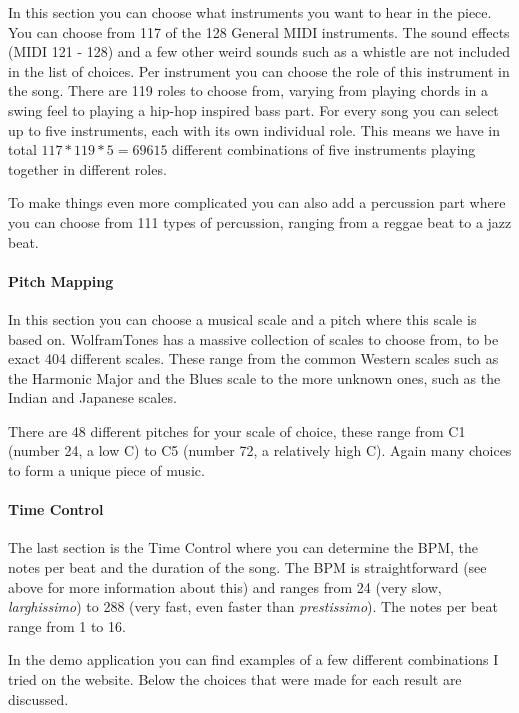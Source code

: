 \documentclass[12pt]{article}
\begin{document}
In this section you can choose what instruments you want to hear in the piece. You can choose from 117 of the 128 General MIDI instruments. The sound effects (MIDI 121 - 128) and a few other weird sounds such as a whistle are not included in the list of choices. Per instrument you can choose the role of this instrument in the song. There are 119 roles to choose from, varying from playing chords in a swing feel to playing a hip-hop inspired bass part. For every song you can select up to five instruments, each with its own individual role. This means we have in total $117*119*5 = 69615$ different combinations of five instruments playing together in different roles.

To make things even more complicated you can also add a percussion part where you can choose from 111 types of percussion, ranging from a reggae beat to a jazz beat.

\paragraph{Pitch Mapping}

 In this section you can choose a musical scale and a pitch where this scale is based on. WolframTones has a massive collection of scales to choose from, to be exact 404 different scales. These range from the common Western scales such as the Harmonic Major and the Blues scale to the more unknown ones, such as the Indian and Japanese scales.

There are 48 different pitches for your scale of choice, these range from C1 (number 24, a low C) to C5 (number 72, a relatively high C). Again many choices to form a unique piece of music.

\paragraph{Time Control}

The last section is the Time Control where you can determine the BPM, the notes per beat and the duration of the song. The BPM is straightforward (see above for more information about this) and ranges from 24 (very slow, \textit{larghissimo}) to 288 (very fast, even faster than \textit{prestissimo}).
The notes per beat range from 1 to 16.
\newline

In the demo application you can find examples of a few different combinations I tried on the website. Below the choices that were made for each result are discussed.
\end{document}
